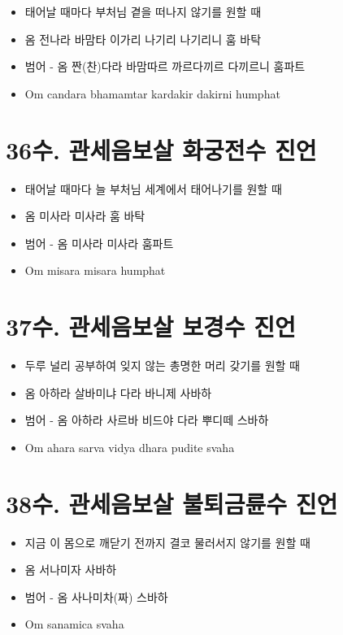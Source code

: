 \documentclass[12pt, a4paper, oneside]{book}
\let\stdsection\section
\renewcommand\section{\newpage\stdsection}
\begin{document}
	 		\begin{itemize}
			\item 태어날 때마다 부처님 곁을 떠나지 않기를 원할 때
			\item 옴 전나라 바맘타 이가리 나기리 나기리니 훔 바탁
			\item 범어 - 옴 짠(찬)다라 바맘따르 까르다끼르 다끼르니 훔파트
			\item Om candara bhamamtar kardakir dakirni humphat
			\end{itemize}





\section{36수. 관세음보살 화궁전수 진언}

	 		\begin{itemize}
			\item 태어날 때마다 늘 부처님 세계에서 태어나기를 원할 때
			\item 옴 미사라 미사라 훔 바탁
			\item 범어 - 옴 미사라 미사라 훔파트
			\item Om misara misara humphat
			\end{itemize}





\section{37수. 관세음보살 보경수 진언}

	 		\begin{itemize}
			\item 두루 널리 공부하여 잊지 않는 총명한 머리 갖기를 원할 때
			\item 옴 아하라 살바미냐 다라 바니제 사바하
			\item 범어 - 옴 아하라 사르바 비드야 다라 뿌디떼 스바하
			\item Om ahara sarva vidya dhara pudite svaha
			\end{itemize}





\section{38수. 관세음보살 불퇴금륜수 진언}

	 		\begin{itemize}
			\item 지금 이 몸으로 깨닫기 전까지 결코 물러서지 않기를 원할 때
			\item 옴 서나미자 사바하
			\item 범어 - 옴 사나미차(짜) 스바하
			\item Om sanamica svaha
			\end{itemize}
\end{document}
